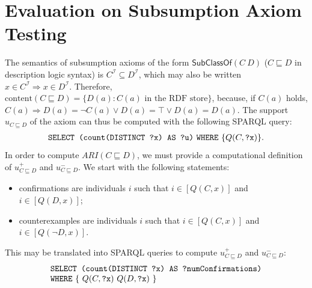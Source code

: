 \documentclass{llncs}
\begin{document}
\section{Evaluation on Subsumption Axiom Testing}
\label{evaluation}
The semantics of subsumption axioms of the form $\mathsf{SubClassOf}(C\ D)$
($C \sqsubseteq D$ in description logic syntax) is $C^\mathcal{I} \subseteq D^\mathcal{I}$,
which may also be written $x \in C^\mathcal{I} \Rightarrow x \in D^\mathcal{I}$.
Therefore, $\mathrm{content}(C \sqsubseteq D) = \{D(a) : \mbox{$C(a)$ in the RDF store} \}$,
because, if $C(a)$ holds, $C(a) \Rightarrow D(a) = \neg C(a) \lor D(a) = \top \lor D(a) = D(a)$.
The support $u_{C \sqsubseteq D}$ of the axiom can thus be computed with the following SPARQL query:
\begin{equation}
  \begin{minipage}[c]{5in}
    \begin{tabbing}
      \quad\=\quad\=\quad\=\kill
      \texttt{SELECT (count(DISTINCT ?x) AS ?u)}
      \texttt{WHERE} \{$Q(C, \mbox{\tt ?x})$\}.
    \end{tabbing}
  \end{minipage}
\end{equation}
In order to compute $ARI(C \sqsubseteq D)$, we must provide a computational definition of $u^+_{C \sqsubseteq D}$ and $u^-_{C \sqsubseteq D}$. We start with the following statements:
\begin{itemize}
\item confirmations are individuals $i$ such that
  $i \in [Q(C, x)]$ and $i \in [Q(D, x)]$;
\item counterexamples are individuals $i$ such that
  $i \in [Q(C, x)]$ and $i \in [Q(\neg D, x)]$.
\end{itemize}
This may be translated into SPARQL queries to compute $u^+_{C \sqsubseteq D}$ and $u^-_{C \sqsubseteq D}$:
\begin{equation}
  \begin{minipage}[c]{5in}
    \begin{tabbing}
      \quad\=\quad\=\quad\=\kill
      \texttt{SELECT (count(DISTINCT ?x) AS ?numConfirmations)}\\
      \texttt{WHERE} \{ $Q(C, \mbox{\tt ?x})$ $Q(D, \mbox{\tt ?x})$ \}
    \end{tabbing}
  \end{minipage}
\end{equation}
\end{document}
